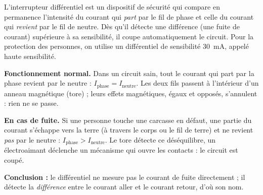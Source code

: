 \documentclass[11pt]{article}
\newcommand{\cle}[1]{{\popxbold\color{popdark}#1}}
\begin{document}
\begin{definition}
L'\cle{interrupteur différentiel} est un dispositif de sécurité qui compare en permanence l'intensité du courant qui \emph{part} par le fil de phase et celle du courant qui \emph{revient} par le fil de neutre. Dès qu'il détecte une différence (une \cle{fuite de courant}) supérieure à sa \cle{sensibilité}, il coupe automatiquement le circuit. Pour la protection des personnes, on utilise un différentiel de sensibilité \SI{30}{mA}, appelé \cle{haute sensibilité}.
\end{definition}

\begin{experience}
\textbf{Fonctionnement normal.} Dans un circuit sain, tout le courant qui part par la phase revient par le neutre : $I_{\text{phase}} = I_{\text{neutre}}$. Les deux fils passent à l'intérieur d'un anneau magnétique (tore) ; leurs effets magnétiques, égaux et opposés, s'annulent : rien ne se passe.

\textbf{En cas de fuite.} Si une personne touche une carcasse en défaut, une partie du courant s'échappe vers la terre (à travers le corps ou le fil de terre) et ne revient \emph{pas} par le neutre : $I_{\text{phase}} > I_{\text{neutre}}$. Le tore détecte ce déséquilibre, un électroaimant déclenche un mécanisme qui ouvre les contacts : le circuit est coupé.

\textbf{Conclusion :} le différentiel ne mesure pas le courant de fuite directement ; il détecte la \emph{différence} entre le courant aller et le courant retour, d'où son nom.
\end{experience}
\end{document}
